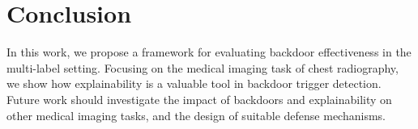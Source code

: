 \documentclass[letterpaper]{article} %
\begin{document}
\section{Conclusion}
In this work, we propose a framework for evaluating backdoor effectiveness in the multi-label setting. Focusing on the medical imaging task of chest radiography, we show how explainability is a valuable tool in backdoor trigger detection. Future work should investigate the impact of backdoors and explainability on other medical imaging tasks, and the design of suitable defense mechanisms.
 

 

\clearpage

\newpage

% 
\end{document}
